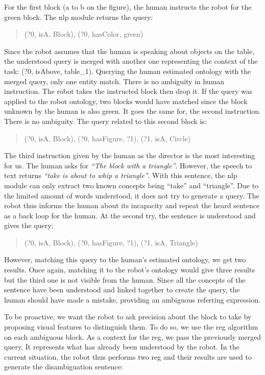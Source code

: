 \documentclass[a4paper,11pt,twoside]{StyleThese}
\begin{document}
For the first block (a to b on the figure), the human instructs the robot for the green block. The \acrlong{nlp} module returns the \sparql{} query:

\begin{quote} 
	\centering 
	(?0, isA, Block), (?0, hasColor, green)
\end{quote}

Since the robot assumes that the human is speaking about objects on the table, the understood query is merged with another one representing the context of the task: (?0, isAbove, table\_1). Querying the human estimated ontology with the merged query, only one entity match. There is no ambiguity in human instruction. The robot takes the instructed block then drop it. If the query was applied to the robot ontology, two blocks would have matched since the block unknown by the human is also green. It goes the same for, the second instruction. There is no ambiguity. The \sparql{} query related to this second block is:

\begin{quote} 
	\centering 
	(?0, isA, Block), (?0, hasFigure, ?1), (?1, isA, Circle)
\end{quote}

The third instruction given by the human as the director is the most interesting for us. The human asks for \textit{``The block with a triangle''}. However, the speech to text returns \textit{``take is about to whip a triangle''}. With this sentence, the \acrshort{nlp} module can only extract two known concepts being ``take'' and ``triangle''. Due to the limited amount of words understood, it does not try to generate a \sparql{} query. The robot thus informs the human about its incapacity and repeat the heard sentence as a back loop for the human. At the second try, the sentence is understood and gives the query:

\begin{quote} 
	\centering 
	(?0, isA, Block), (?0, hasFigure, ?1), (?1, isA, Triangle)
\end{quote}

However, matching this query to the human's estimated ontology, we get two results. Once again, matching it to the robot's ontology would give three results but the third one is not visible from the human. Since all the concepts of the sentence have been understood and linked together to create the query, the human should have made a mistake, providing an ambiguous referring expression.

To be proactive, we want the robot to ask precision about the block to take by proposing visual features to distinguish them. To do so, we use the \acrshort{reg} algorithm on each ambiguous block. As a context for the \acrshort{reg}, we pass the previously merged \sparql{} query. It represents what has already been understood by the robot. In the current situation, the robot thus performs two \acrshort{reg} and their results are used to generate the disambiguation sentence:
\end{document}

